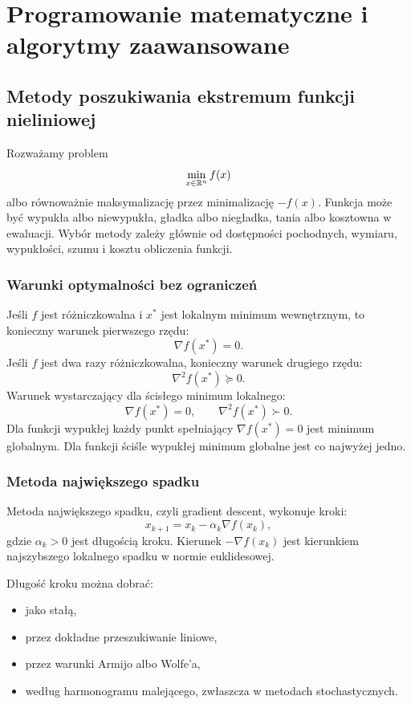 \section{Programowanie matematyczne i algorytmy zaawansowane}

\subsection{Metody poszukiwania ekstremum funkcji nieliniowej}

Rozważamy problem
\[
\min_{x\in\mathbb{R}^n} f(x)
\]
albo równoważnie maksymalizację przez minimalizację $-f(x)$. Funkcja może być wypukła albo niewypukła, gładka albo niegładka, tania albo kosztowna w ewaluacji. Wybór metody zależy głównie od dostępności pochodnych, wymiaru, wypukłości, szumu i kosztu obliczenia funkcji.

\subsubsection{Warunki optymalności bez ograniczeń}

Jeśli $f$ jest różniczkowalna i $x^*$ jest lokalnym minimum wewnętrznym, to konieczny warunek pierwszego rzędu:
\[
\nabla f(x^*)=0.
\]
Jeśli $f$ jest dwa razy różniczkowalna, konieczny warunek drugiego rzędu:
\[
\nabla^2 f(x^*) \succeq 0.
\]
Warunek wystarczający dla ścisłego minimum lokalnego:
\[
\nabla f(x^*)=0,\qquad \nabla^2 f(x^*)\succ 0.
\]
Dla funkcji wypukłej każdy punkt spełniający $\nabla f(x^*)=0$ jest minimum globalnym. Dla funkcji ściśle wypukłej minimum globalne jest co najwyżej jedno.

\subsubsection{Metoda największego spadku}

Metoda największego spadku, czyli gradient descent, wykonuje kroki:
\[
x_{k+1}=x_k-\alpha_k\nabla f(x_k),
\]
gdzie $\alpha_k>0$ jest długością kroku. Kierunek $-\nabla f(x_k)$ jest kierunkiem najszybszego lokalnego spadku w normie euklidesowej.

Długość kroku można dobrać:
\begin{itemize}
  \item jako stałą,
  \item przez dokładne przeszukiwanie liniowe,
  \item przez warunki Armijo albo Wolfe'a,
  \item według harmonogramu malejącego, zwłaszcza w metodach stochastycznych.
\end{itemize}

